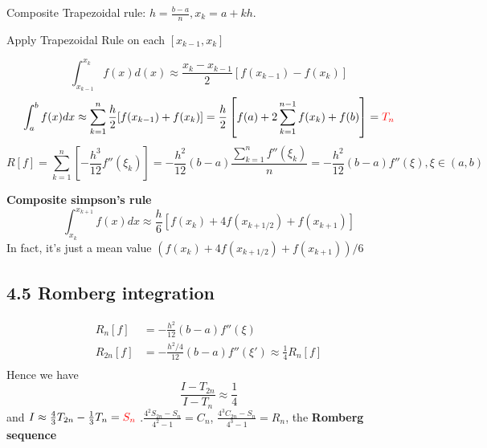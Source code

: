 \documentclass[11pt]{article}
\begin{document}
Composite Trapezoidal rule: \(h=\frac{b-a}{n}, x_k=a+kh\).

Apply Trapezoidal Rule on each \([x_{k-1}, x_k]\)

\begin{equation*}
\int_{x_{k-1}}^{x_k}f(x)d(x)\approx \frac{x_k-x_{k-1}}{2}[f(x_{k-1})-f(x_k)]
\end{equation*}
\begin{equation*}
\int_a^bf(x)dx\approx \displaystyle\sum_{k=1}^n\frac{h}{2}[f(x_{k-1})+f(x_k)]=
\frac{h}{2}\left[f(a)+2 \displaystyle\sum_{k=1}^{n-1}f(x_k)+f(b)\right]=
\textcolor{red}{T_n} 
\end{equation*}
\begin{equation*}
R[f]=\displaystyle\sum_{k=1}^n\left[-\frac{h^3}{12}f''(\xi_k)\right]=-\frac{h^2}
{12}(b-a)\frac{\displaystyle\sum_{k=1}^nf''(\xi_k)}{n}=
-\frac{h^2}{12}(b-a)f''(\xi),\xi\in(a,b)
\end{equation*}


\textbf{Composite simpson's rule}
\begin{equation*}
\int_{x_k}^{x_{k+1}}f(x)dx\approx\frac{h}{6}\left[f(x_k)+4f(x_{k+1/2})+f(x_{k+1})\right]
\end{equation*}
In fact, it's just a mean value \((f(x_k)+4f(x_{k+1/2})+f(x_{k+1})) / 6\)

\subsection{4.5 Romberg integration}
\label{sec:orgaa65155}
\begin{align*}
R_n[f]&=-\frac{h^2}{12}(b-a)f''(\xi)\\
R_{2n}[f]&=-\frac{h^2/4}{12}(b-a)f''(\xi')\approx \frac{1}{4}R_n[f]\\
\end{align*}
Hence we have
\begin{equation*}
\frac{I-T_{2n}}{I-T_n}\approx\frac{1}{4}
\end{equation*}
and \(I\approx \frac{4}{3}T_{2n}-\frac{1}{3}T_n=\textcolor{red}{S_n}\)
.\(\frac{4^2S_{2n}-S_n}{4^2-1}=C_n\), \(\frac{4^3C_{2n}-S_n}{4^3-1}=R_n\), the
\textbf{Romberg sequence}
\end{document}
